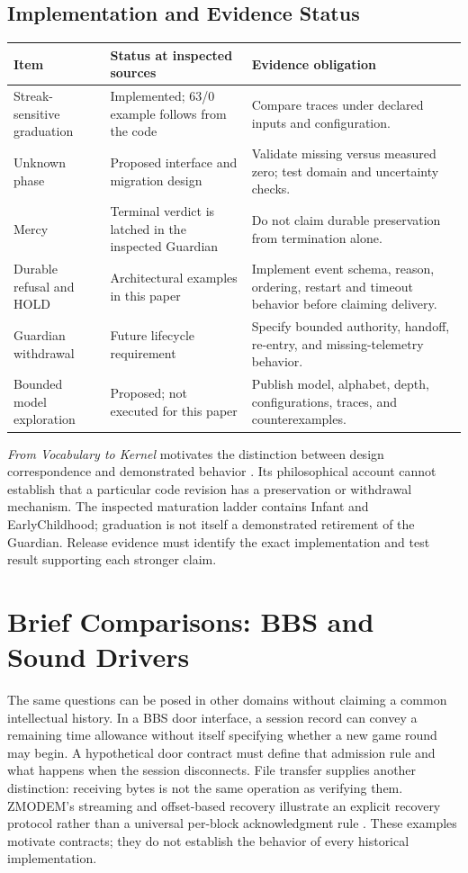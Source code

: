 \documentclass[11pt]{article}
\begin{document}
\subsection{Implementation and Evidence Status}
\begin{center}
\small
\begin{tabularx}{\textwidth}{@{}>{\RaggedRight\arraybackslash}p{}YY@{}}
\toprule
Item & Status at inspected sources & Evidence obligation\\\midrule
Streak-sensitive graduation & Implemented; 63/0 example follows from the code & Compare traces under declared inputs and configuration.\\
Unknown phase & Proposed interface and migration design & Validate missing versus measured zero; test domain and uncertainty checks.\\
Mercy & Terminal verdict is latched in the inspected Guardian & Do not claim durable preservation from termination alone.\\
Durable refusal and HOLD & Architectural examples in this paper & Implement event schema, reason, ordering, restart and timeout behavior before claiming delivery.\\
Guardian withdrawal & Future lifecycle requirement & Specify bounded authority, handoff, re-entry, and missing-telemetry behavior.\\
Bounded model exploration & Proposed; not executed for this paper & Publish model, alphabet, depth, configurations, traces, and counterexamples.\\
\bottomrule
\end{tabularx}
\end{center}

\emph{From Vocabulary to Kernel} motivates the distinction between design correspondence and demonstrated behavior \cite{flyxion-kernel}. Its philosophical account cannot establish that a particular code revision has a preservation or withdrawal mechanism. The inspected maturation ladder contains Infant and EarlyChildhood; graduation is not itself a demonstrated retirement of the Guardian. Release evidence must identify the exact implementation and test result supporting each stronger claim.

\section{Brief Comparisons: BBS and Sound Drivers}
The same questions can be posed in other domains without claiming a common intellectual history. In a BBS door interface, a session record can convey a remaining time allowance without itself specifying whether a new game round may begin. A hypothetical door contract must define that admission rule and what happens when the session disconnects. File transfer supplies another distinction: receiving bytes is not the same operation as verifying them. ZMODEM's streaming and offset-based recovery illustrate an explicit recovery protocol rather than a universal per-block acknowledgment rule \cite{forsberg1988}. These examples motivate contracts; they do not establish the behavior of every historical implementation.
\end{document}
